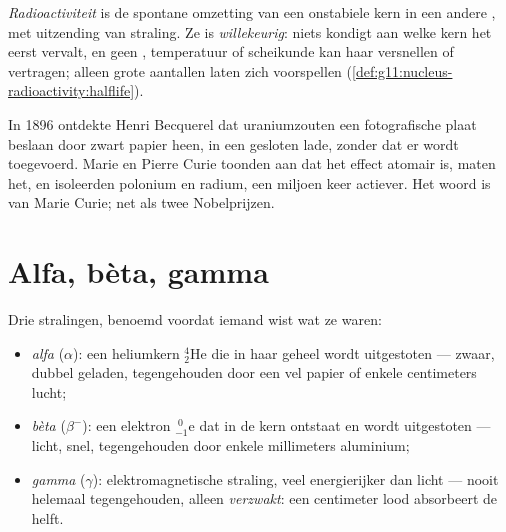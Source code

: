 \begin{definition}[Radioactiviteit]\label{def:g11:nucleus-radioactivity:radioactivity}
\emph{Radioactiviteit} is de spontane omzetting van
een onstabiele kern in een andere , met uitzending van straling.
Ze is \emph{willekeurig}: niets kondigt aan welke kern het eerst vervalt,
en geen , temperatuur of scheikunde kan haar versnellen of vertragen;
alleen grote aantallen laten zich voorspellen
(\cref{def:g11:nucleus-radioactivity:halflife}).
\end{definition}

\begin{remark}\label{rem:g11:nucleus-radioactivity:curie}
In 1896 ontdekte Henri Becquerel dat uraniumzouten een fotografische plaat
beslaan door zwart papier heen, in een gesloten lade, zonder dat er
 wordt toegevoerd. Marie en Pierre Curie toonden aan dat het effect
atomair is, maten het, en isoleerden polonium en radium, een miljoen keer
actiever. Het woord \emph{} is van Marie Curie; net als
twee Nobelprijzen.
\end{remark}

\section{Alfa, bèta, gamma}

\begin{definition}\label{def:g11:nucleus-radioactivity:abg}
Drie stralingen, benoemd voordat iemand wist wat ze waren:
\begin{itemize}
  \item \emph{alfa} ($\alpha$): een heliumkern
        ${}^{4}_{2}\mathrm{He}$ die in haar geheel wordt uitgestoten ---
        zwaar, dubbel geladen, tegengehouden door een vel papier of enkele
        centimeters lucht;
  \item \emph{bèta} ($\beta^-$): een elektron
        ${}^{\;0}_{-1}\mathrm{e}$ dat in de kern ontstaat en wordt
        uitgestoten --- licht, snel, tegengehouden door enkele
        millimeters aluminium;
  \item \emph{gamma} ($\gamma$): elektromagnetische
        straling, veel energierijker dan licht --- nooit helemaal
        tegengehouden, alleen \emph{verzwakt}: een
        centimeter lood absorbeert de helft.
\end{itemize}
\end{definition}

